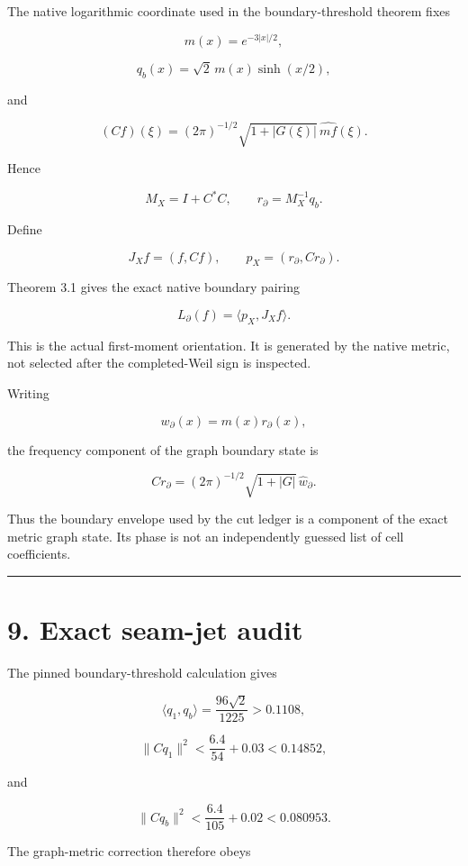 The native logarithmic coordinate used in the boundary-threshold theorem fixes

\[
m(x)=e^{-3|x|/2},
\]

\[
q_b(x)=\sqrt2\,m(x)\sinh(x/2),
\]

and

\[
(Cf)(\xi)
=(2\pi)^{-1/2}
\sqrt{1+|G(\xi)|}\,
\widehat{mf}(\xi).
\]

Hence

\[
M_X=I+C^*C,
\qquad
r_\partial=M_X^{-1}q_b.
\]

Define

\[
\boxed{
J_Xf=(f,Cf),
\qquad
p_X=(r_\partial,Cr_\partial).
}
\]

Theorem 3.1 gives the exact native boundary pairing

\[
\boxed{
L_\partial(f)
=
\langle p_X,J_Xf\rangle.
}
\tag{8.1}
\]

This is the actual first-moment orientation. It is generated by the native
metric, not selected after the completed-Weil sign is inspected.

Writing

\[
w_\partial(x)=m(x)r_\partial(x),
\]

the frequency component of the graph boundary state is

\[
\boxed{
Cr_\partial
=(2\pi)^{-1/2}
\sqrt{1+|G|}\,\widehat w_\partial.
}
\tag{8.2}
\]

Thus the boundary envelope used by the cut ledger is a component of the exact
metric graph state. Its phase is not an independently guessed list of cell
coefficients.

\begin{center}\rule{0.5\linewidth}{0.5pt}\end{center}

\hypertarget{exact-seam-jet-audit}{%
\section{9. Exact seam-jet audit}\label{exact-seam-jet-audit}}

The pinned boundary-threshold calculation gives

\[
\langle q_1,q_b\rangle
=\frac{96\sqrt2}{1225}>0.1108,
\]

\[
\|Cq_1\|^2<\frac{6.4}{54}+0.03<0.14852,
\]

and

\[
\|Cq_b\|^2<\frac{6.4}{105}+0.02<0.080953.
\]

The graph-metric correction therefore obeys

